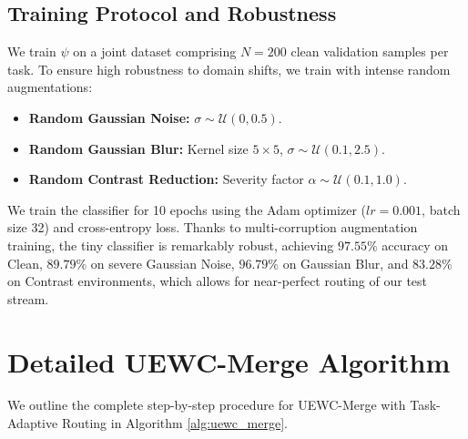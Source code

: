 \documentclass{article}
\theoremstyle{plain}
\theoremstyle{definition}
\theoremstyle{remark}
\begin{document}
\subsection{Training Protocol and Robustness}
We train $\psi$ on a joint dataset comprising $N=200$ clean validation samples per task. To ensure high robustness to domain shifts, we train with intense random augmentations:
\begin{itemize}
    \item \textbf{Random Gaussian Noise:} $\sigma \sim \mathcal{U}(0, 0.5)$.
    \item \textbf{Random Gaussian Blur:} Kernel size $5 \times 5$, $\sigma \sim \mathcal{U}(0.1, 2.5)$.
    \item \textbf{Random Contrast Reduction:} Severity factor $\alpha \sim \mathcal{U}(0.1, 1.0)$.
\end{itemize}
We train the classifier for 10 epochs using the Adam optimizer ($lr = 0.001$, batch size 32) and cross-entropy loss. Thanks to multi-corruption augmentation training, the tiny classifier is remarkably robust, achieving $97.55\%$ accuracy on Clean, $89.79\%$ on severe Gaussian Noise, $96.79\%$ on Gaussian Blur, and $83.28\%$ on Contrast environments, which allows for near-perfect routing of our test stream.

\section{Detailed UEWC-Merge Algorithm}
We outline the complete step-by-step procedure for UEWC-Merge with Task-Adaptive Routing in Algorithm \ref{alg:uewc_merge}.
\end{document}
